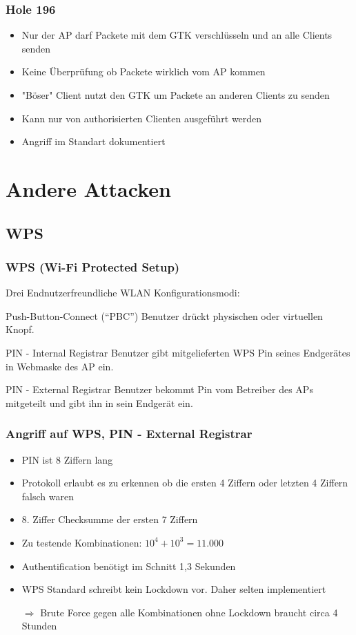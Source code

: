 \documentclass{beamer}
\begin{document}
\begin{frame}
\frametitle{Hole 196}
\begin{itemize}
	\item Nur der AP darf Packete mit dem GTK verschlüsseln und an alle Clients senden
	\item Keine Überprüfung ob Packete wirklich vom AP kommen
    \item "Böser" Client nutzt den GTK um Packete an anderen Clients zu senden
	\item Kann nur von authorisierten Clienten ausgeführt werden
	\item Angriff im Standart dokumentiert
\end{itemize}
\end{frame}

\section{Andere Attacken}
\subsection{WPS}

\begin{frame}
\frametitle{WPS (Wi-Fi Protected Setup)}
Drei Endnutzerfreundliche WLAN Konfigurationsmodi:
\begin{block}{Push-Button-Connect (“PBC”)}
Benutzer drückt physischen oder virtuellen Knopf.
\end{block}
\begin{block}{PIN - Internal Registrar}
Benutzer gibt mitgelieferten WPS Pin seines Endgerätes in Webmaske des AP ein.
\end{block}
\begin{block}{PIN - External Registrar}
Benutzer bekommt Pin vom Betreiber des APs mitgeteilt und gibt ihn in sein Endgerät ein.
\end{block}
\end{frame}


\begin{frame}
\frametitle{Angriff auf WPS, PIN - External Registrar \cite{wps_attack}}
\begin{itemize}
	\item PIN ist 8 Ziffern lang
	\item Protokoll erlaubt es zu erkennen ob die ersten 4 Ziffern oder letzten 4 Ziffern falsch waren
	\item 8. Ziffer Checksumme der ersten 7 Ziffern
	\item Zu testende Kombinationen: $10^4+10^3 = 11.000$
	\item Authentification benötigt im Schnitt 1,3 Sekunden
	\item WPS Standard schreibt kein Lockdown vor. Daher selten implementiert
	\item[$\Rightarrow$] Brute Force gegen alle Kombinationen ohne Lockdown braucht circa 4 Stunden
\end{itemize}
\end{frame}
\end{document}
